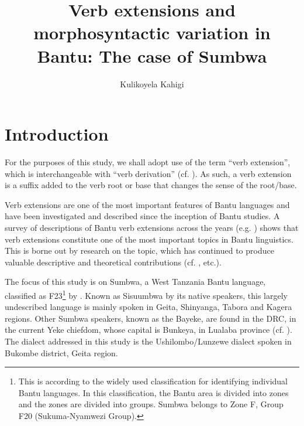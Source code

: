 \documentclass[output=paper		  ]{langscibook}
\author{Kulikoyela Kahigi\orcid{}\affiliation{Saint Augustine University of Tanzania, Mwanza}}
\title[Verb extensions and morphosyntactic variation in  Sumbwa]{Verb extensions and morphosyntactic variation in Bantu: The case of Sumbwa}
\begin{document}
\maketitle 

\section{Introduction}\label{sec:kahigi:1}

{For the purposes of this study, we shall adopt  use of the term ``verb extension'', which is interchangeable with ``verb derivation'' (cf. \citealt{KatambaStonham2006}). As such, a verb extension is a suffix added to the verb root or base that changes the sense of the root/base.} 

Verb extensions are one of the most important features of Bantu languages and have been investigated and described since the inception of Bantu studies. A survey of descriptions of Bantu verb extensions across the years (e.g. \citealt{Madan1903, Ashton1947, Johnson1939, Guthrie1962, Eastman1967, Scotton1967, Bokamba1975, Khamis1972, Khamis1985, Rugemalira1993runyambo,Rugemalira2005, Schadeberg2003}) shows that verb extensions constitute one of the most important topics in Bantu linguistics. This is borne out by research on the topic, which has continued to produce valuable descriptive and theoretical contributions (cf. \citealt{Baker1985, Alsina1999, Marten2003, Hyman2002, KatambaStonham2006, Waweru2005, Khumalo2007, Chabata2007, KulaMarten2010, DomEtAl2018}, etc.).

{The focus of this study is on Sumbwa, a West Tanzania Bantu language, classified as F23}\footnote{{This is according to the widely used \citet{Guthrie1948} classification for identifying individual Bantu languages. In this classification, the Bantu area is divided into zones and the zones are divided into groups. Sumbwa belongs to Zone F, Group F20 (Sukuma-Nyamwezi Group).}} {by \textcites[]{Guthrie1948}[11]{Guthrie1970}. Known as Sisuumbwa by its native speakers, this largely undescribed language is mainly spoken in Geita, Shinyanga, Tabora and Kagera regions.} {Other Sumbwa speakers, known as the Bayeke, are found in the DRC, in the current Yeke chiefdom, whose capital is Bunkeya, in Lualaba province (cf. \citealt{MunongoGrevisse1967}). The dialect addressed in this study is the Ushilombo/Lunzewe dialect spoken in Bukombe district, Geita region.} 
\end{document}
